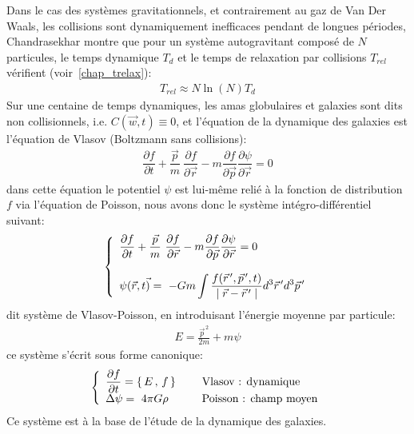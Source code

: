 Dans le cas des systèmes gravitationnels, et contrairement au gaz de Van Der Waals, les collisions sont dynamiquement inefficaces pendant de longues
périodes, Chandrasekhar montre que pour un système autogravitant composé de $N$ particules, le temps dynamique $T_{d}$ et le temps de
relaxation par collisions $T_{rel}$ vérifient (voir~\ref{chap_trelax}):
\begin{align*}
	T_{rel}\approx N\ln\left(  N\right)  T_{d}%
\end{align*}
Sur une centaine de temps dynamiques, les amas globulaires et galaxies sont dits non collisionnels, i.e. $C\left(  \vec{w}
,t\right)  \equiv0$, et l'équation de la dynamique des galaxies est l'équation de Vlasov (Boltzmann sans collisions):
\begin{align*}
	\dfrac{\partial f}{\partial t}+\dfrac{\vec{p}}{m}\ \dfrac{\partial f}{\partial\vec{r}}-m\dfrac{\partial f}{\partial\vec{p}}\dfrac
	{\partial\psi}{\partial\vec{r}}=0
\end{align*}
dans cette équation le potentiel $\psi$ est lui-même relié à la fonction de distribution $f$ via l'équation de Poisson, nous avons donc le système
intégro-différentiel suivant:
\begin{align*}
	\left\{
		\begin{array}[c]{l}%
			\dfrac{\partial f}{\partial t}+\dfrac{\vec{p}}{m}\ \dfrac{\partial f}{\partial\vec{r}}-m\dfrac{\partial f}{\partial\vec{p}}\dfrac
			{\partial\psi}{\partial\vec{r}}=0\\
			\\
			\psi(\vec{r},t\vec{)}=~-Gm\displaystyle\int\dfrac{f(\vec{r}^{\,\prime},\vec{p}^{\,\prime},t)}{\mid\vec{r}-\vec{r}^{\,\prime}\mid}%
			d^{3}\vec{r}^{\,\prime}d^{3}\vec{p}^{\,\prime}%
		\end{array}
	\right.
\end{align*}
dit système de Vlasov-Poisson, en introduisant l'énergie moyenne par particule:
\begin{align*}
	E=\frac{\vec{p}^{\,2}}{2m}+m\psi
\end{align*}
ce système s'écrit sous forme canonique:
\begin{align*}
	\left\{
		\begin{array}[c]{lll}%
			\dfrac{\partial f}{\partial t}=\left\{  \,E\,,\,f\,\right\}   &  & \text{{\ {Vlasov} : dynamique}}\\
			\Delta\psi=~4\pi G\rho &  & \text{{\ {Poisson} : champ {moyen}}}%
		\end{array}
	\right.
\end{align*}
Ce système est à la base de l'étude de la dynamique des galaxies.

